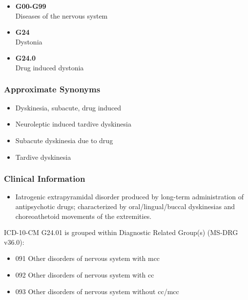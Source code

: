\begin{itemize}
\tightlist
\item
  \textbf{G00-G99}\\
  Diseases of the nervous system
\item
  \textbf{G24}\\
  Dystonia
\item
  \textbf{G24.0}\\
  Drug induced dystonia
\end{itemize}

\hypertarget{approximate-synonyms-2}{%
\subsubsection{Approximate Synonyms}\label{approximate-synonyms-2}}

\begin{itemize}
\tightlist
\item
  Dyskinesia, subacute, drug induced
\item
  Neuroleptic induced tardive dyskinesia
\item
  Subacute dyskinesia due to drug
\item
  Tardive dyskinesia
\end{itemize}

\hypertarget{clinical-information-1}{%
\subsubsection{Clinical Information}\label{clinical-information-1}}

\begin{itemize}
\tightlist
\item
  Iatrogenic extrapyramidal disorder produced by long-term administration of antipsychotic drugs; characterized by oral/lingual/buccal dyskinesias and choreoathetoid movements of the extremities.
\end{itemize}

\noindent ICD-10-CM G24.01 is grouped within Diagnostic Related Group(s) (MS-DRG v36.0):

\begin{itemize}
\tightlist
\item
  091 Other disorders of nervous system with mcc
\item
  092 Other disorders of nervous system with cc
\item
  093 Other disorders of nervous system without cc/mcc
\end{itemize}
\newpage

